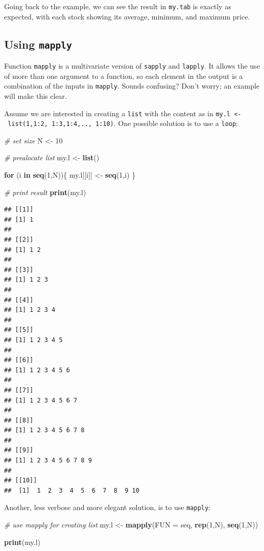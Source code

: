 \documentclass[11pt,]{book}
\newenvironment{Shaded}{\begin{snugshade}}{\end{snugshade}}
\newcommand{\KeywordTok}[1]{\textcolor[rgb]{0.27,0.27,0.27}{\textbf{#1}}}
\newcommand{\DataTypeTok}[1]{\textcolor[rgb]{0.27,0.27,0.27}{#1}}
\newcommand{\DecValTok}[1]{\textcolor[rgb]{0.06,0.06,0.06}{#1}}
\newcommand{\StringTok}[1]{\textcolor[rgb]{0.5,0.5,0.5}{#1}}
\newcommand{\CommentTok}[1]{\textcolor[rgb]{0.56,0.35,0.01}{\textit{#1}}}
\newcommand{\ControlFlowTok}[1]{\textcolor[rgb]{0.13,0.29,0.53}{\textbf{#1}}}
\newcommand{\NormalTok}[1]{#1}
\begin{document}
Going back to the example, we can see the result in \texttt{my.tab} is
exactly as expected, with each stock showing its average, minimum, and
maximum price.

\subsection{\texorpdfstring{Using
\texttt{mapply}}{Using mapply}}\label{using-mapply}

Function \texttt{mapply} is a multivariate version of \texttt{sapply}
and \texttt{lapply}. It allows the use of more than one argument to a
function, so each element in the output is a combination of the inputs
in \texttt{mapply}. Sounds confusing? Don't worry; an example will make
this clear. 

Assume we are interested in creating a \texttt{list} with the content as
in \texttt{my.l\ \textless{}-\ list(1,1:2,\ 1:3,1:4,..,\ 1:10)}. One
possible solution is to use a \texttt{loop}:

\begin{Shaded}
\begin{Highlighting}[]
\CommentTok{# set size}
\NormalTok{N <-}\StringTok{ }\DecValTok{10}

\CommentTok{# prealocate list}
\NormalTok{my.l <-}\StringTok{ }\KeywordTok{list}\NormalTok{()}

\ControlFlowTok{for}\NormalTok{ (i }\ControlFlowTok{in} \KeywordTok{seq}\NormalTok{(}\DecValTok{1}\NormalTok{,N))\{}
\NormalTok{  my.l[[i]] <-}\StringTok{ }\KeywordTok{seq}\NormalTok{(}\DecValTok{1}\NormalTok{,i)}
\NormalTok{\}}

\CommentTok{# print result}
\KeywordTok{print}\NormalTok{(my.l)}
\end{Highlighting}
\end{Shaded}

\begin{verbatim}
## [[1]]
## [1] 1
## 
## [[2]]
## [1] 1 2
## 
## [[3]]
## [1] 1 2 3
## 
## [[4]]
## [1] 1 2 3 4
## 
## [[5]]
## [1] 1 2 3 4 5
## 
## [[6]]
## [1] 1 2 3 4 5 6
## 
## [[7]]
## [1] 1 2 3 4 5 6 7
## 
## [[8]]
## [1] 1 2 3 4 5 6 7 8
## 
## [[9]]
## [1] 1 2 3 4 5 6 7 8 9
## 
## [[10]]
##  [1]  1  2  3  4  5  6  7  8  9 10
\end{verbatim}

Another, less verbose and more elegant solution, is to use
\texttt{mapply}:

\begin{Shaded}
\begin{Highlighting}[]
\CommentTok{# use mapply for creating list}
\NormalTok{my.l <-}\StringTok{ }\KeywordTok{mapply}\NormalTok{(}\DataTypeTok{FUN =}\NormalTok{ seq, }\KeywordTok{rep}\NormalTok{(}\DecValTok{1}\NormalTok{,N), }\KeywordTok{seq}\NormalTok{(}\DecValTok{1}\NormalTok{,N))}

\KeywordTok{print}\NormalTok{(my.l)}
\end{Highlighting}
\end{Shaded}
\end{document}
